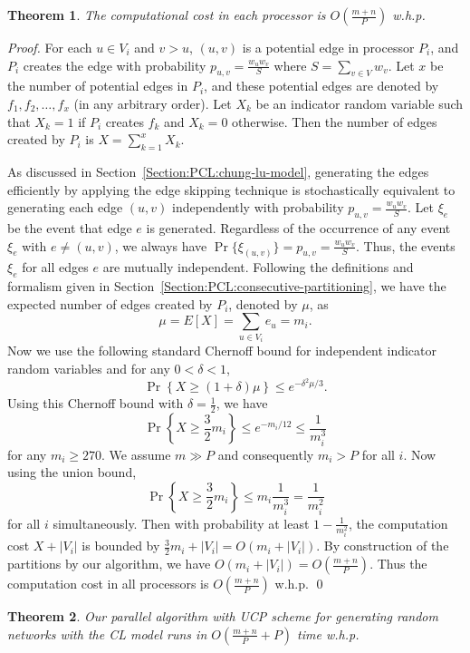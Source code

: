\documentclass[conference,letterpaper,10pt]{IEEEtran}
\newtheorem{theorem}{Theorem}
\begin{document}
\begin{theorem}\label{thm:comp_load}
The computational cost in each processor is $O(\frac{m+n}{P})$  w.h.p.	
\end{theorem}
\begin{proof}
For each $u \in V_i$  and $v > u$, $(u,v)$  is a potential edge in processor $P_i$, and $P_i$ creates the edge with probability $p_{u,v}=\frac{w_uw_v}{S}$  where $S = \sum_{v\in V}{w_v}$. Let $x$ be the number of potential edges in $P_i$, and these potential edges are denoted by $f_1, f_2, \ldots, f_x$  (in any arbitrary order). Let $X_k$  be an indicator random variable such that $X_k = 1$  if $P_i$  creates $f_k$  and $X_k = 0$  otherwise. Then the number of edges created by $P_i$  is $X=\sum_{k=1}^{x}{X_k}$. 

As discussed in Section~\ref{Section:PCL:chung-lu-model}, generating the edges efficiently by applying the edge skipping technique is stochastically equivalent to generating each edge $(u,v)$ independently with probability $p_{u,v}=\frac{w_uw_v}{S}$. Let $\xi_{e}$ be the event that edge $e$ is generated. Regardless of the occurrence of any event $\xi_{e}$ with $e \ne (u,v)$, we always have $\Pr\{\xi_{(u,v)}\} = p_{u,v}=\frac{w_uw_v}{S}$. Thus, the events $\xi_{e}$ for all edges $e$ are mutually independent. Following the definitions and formalism given in Section~\ref{Section:PCL:consecutive-partitioning}, we have the expected number of edges created by $P_i$, denoted by $\mu$, as 
$$\textstyle\mu = E[X] = \sum_{u\in V_i} e_u = m_i.$$
Now we use the following standard Chernoff  bound for independent indicator random variables and for any $0< \delta < 1$, 
$$\textstyle\Pr\left\{X \ge (1+\delta) \mu\right\} \le e^{-\delta^2 \mu/3}.$$ 
Using this Chernoff  bound with $\delta = \frac{1}{2}$, we have 
$$\textstyle\Pr\left\{X \ge \frac{3}{2} m_i\right\} \le e^{- m_i/12} \le \frac{1}{m_i^3}$$ for any $m_i \ge 270$. We assume $m \gg P$  and consequently $m_i > P$  for all $i$. Now using the union bound, 
$$\textstyle\Pr\left\{X \ge \frac{3}{2} m_i\right\} \le m_i\frac{1}{m_i^3} = \frac{1}{m_i^2}$$
for all $i$  simultaneously. 
Then with probability at least $1 - \frac{1}{m_i^2}$, the computation cost $X + |V_i|$ is bounded by $\frac{3}{2}m_i+|V_i|=O(m_i+|V_i|)$. By
construction of the partitions by our algorithm, we have $O\left(m_i+|V_i|\right) = O\left(\frac{m +n}{P}\right)$. Thus the computation cost in all processors is $O\left( \frac{m +n}{P}\right)$ w.h.p.
\qed
\end{proof}

\begin{theorem}\label{thm:chunglutime}
Our parallel algorithm with UCP  scheme for generating random networks with the CL model runs in $O(\frac{m+n}{P} + P)$  time w.h.p.
\end{theorem}
\end{document}

